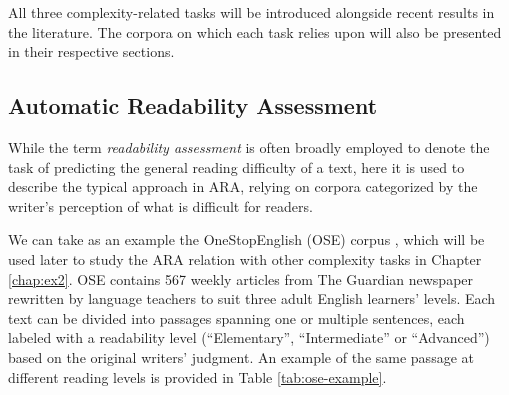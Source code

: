 \documentclass[a4paper, nobind]{templates/ociamthesis}
\begin{document}
All three complexity-related tasks will be introduced alongside recent results in the literature. The corpora on which each task relies upon will also be presented in their respective sections.

\hypertarget{subsubchap:readability}{%
\subsection{Automatic Readability Assessment}\label{subsubchap:readability}}

While the term \emph{readability assessment} is often broadly employed to denote the task of predicting the general reading difficulty of a text, here it is used to describe the typical approach in ARA, relying on corpora categorized by the writer's perception of what is difficult for readers.

We can take as an example the OneStopEnglish (OSE) corpus \autocite{vajjala-lucic-2018-onestopenglish}, which will be used later to study the ARA relation with other complexity tasks in Chapter \ref{chap:ex2}. OSE contains 567 weekly articles from The Guardian newspaper rewritten by language teachers to suit three adult English learners' levels. Each text can be divided into passages spanning one or multiple sentences, each labeled with a readability level (``Elementary'', ``Intermediate'' or ``Advanced'') based on the original writers' judgment. An example of the same passage at different reading levels is provided in Table \ref{tab:ose-example}.
\end{document}
